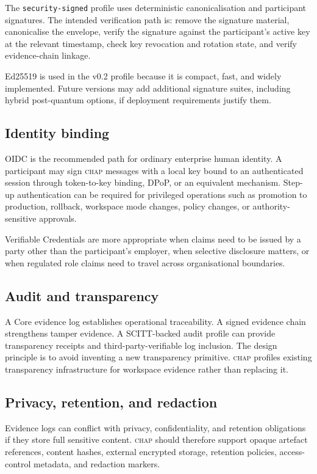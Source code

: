 \documentclass[11pt]{article}
\newcommand{\chap}{\textsc{chap}}
\begin{document}
The \texttt{security-signed} profile uses deterministic canonicalisation and participant signatures. The intended verification path is: remove the signature material, canonicalise the envelope, verify the signature against the participant's active key at the relevant timestamp, check key revocation and rotation state, and verify evidence-chain linkage.

Ed25519 is used in the v0.2 profile because it is compact, fast, and widely implemented. Future versions may add additional signature suites, including hybrid post-quantum options, if deployment requirements justify them.

\subsection{Identity binding}

OIDC is the recommended path for ordinary enterprise human identity. A participant may sign \chap{} messages with a local key bound to an authenticated session through token-to-key binding, DPoP, or an equivalent mechanism. Step-up authentication can be required for privileged operations such as promotion to production, rollback, workspace mode changes, policy changes, or authority-sensitive approvals.

Verifiable Credentials are more appropriate when claims need to be issued by a party other than the participant's employer, when selective disclosure matters, or when regulated role claims need to travel across organisational boundaries.

\subsection{Audit and transparency}

A Core evidence log establishes operational traceability. A signed evidence chain strengthens tamper evidence. A SCITT-backed audit profile can provide transparency receipts and third-party-verifiable log inclusion. The design principle is to avoid inventing a new transparency primitive. \chap{} profiles existing transparency infrastructure for workspace evidence rather than replacing it.

\subsection{Privacy, retention, and redaction}

Evidence logs can conflict with privacy, confidentiality, and retention obligations if they store full sensitive content. \chap{} should therefore support opaque artefact references, content hashes, external encrypted storage, retention policies, access-control metadata, and redaction markers.
\end{document}
